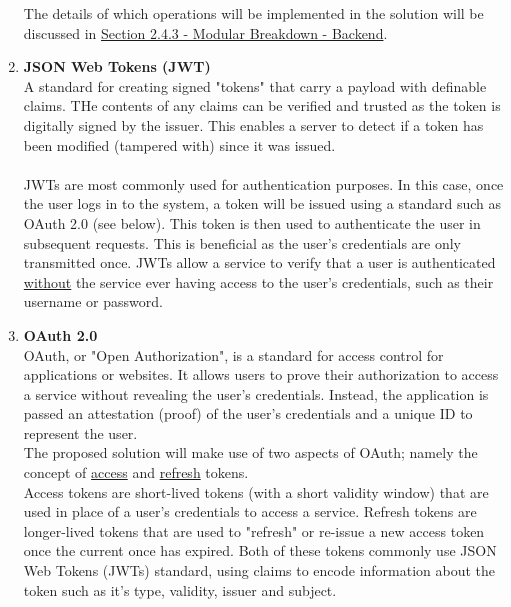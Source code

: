 \documentclass[../../main.tex]{subfiles}
\begin{document}
\begin{enumerate}
            \noindent The details of which operations will be implemented in the solution will be discussed
            in \underline{Section 2.4.3 - Modular Breakdown - Backend}.


      \item \textbf{JSON Web Tokens (JWT)}\\
            A standard for creating signed "tokens" that carry a payload
            with definable claims. THe contents of any claims
            can be verified and trusted as the token is digitally signed
            by the issuer. This enables a server to detect if a token has been modified
            (tampered with) since it was issued.\\\\
            JWTs are most commonly used for authentication purposes.
            In this case, once the user logs in to the system,
            a token will be issued using a standard such as OAuth 2.0 (see below).
            This token is then used to authenticate
            the user in subsequent requests. This is beneficial as the user's
            credentials are only transmitted once. JWTs allow a service to verify
            that a user is authenticated \underline{without} the service ever having
            access to the user's credentials, such as their username or password.

      \item \textbf{OAuth 2.0}\\
            OAuth, or "Open Authorization", is a standard for access control for applications or websites.
            It allows users to prove their authorization to access a service without revealing the user's
            credentials. Instead, the application is passed an attestation (proof) of the user's credentials
            and a unique ID to represent the user.\\

            The proposed solution will make use of two aspects of OAuth; namely the concept of \underline{access}
            and \underline{refresh} tokens.\\

            Access tokens are short-lived tokens (with a short validity window) that are used in place of
            a user's credentials to access a service. Refresh tokens are longer-lived tokens that are used
            to "refresh" or re-issue a new access token once the current once has expired. Both of these tokens
            commonly use JSON Web Tokens (JWTs) standard, using claims to encode information about the token
            such as it's type, validity, issuer and subject.

\end{enumerate}
\end{document}
